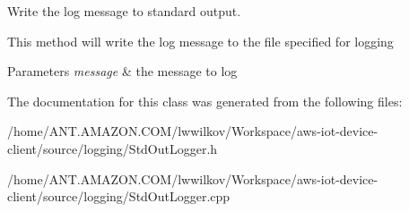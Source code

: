 Write the log message to standard output. 

This method will write the log message to the file specified for logging 
\begin{DoxyParams}{Parameters}
{\em message} & the message to log \\
\hline
\end{DoxyParams}


The documentation for this class was generated from the following files\+:\begin{DoxyCompactItemize}
\item 
/home/\+A\+N\+T.\+A\+M\+A\+Z\+O\+N.\+C\+O\+M/lwwilkov/\+Workspace/aws-\/iot-\/device-\/client/source/logging/Std\+Out\+Logger.\+h\item 
/home/\+A\+N\+T.\+A\+M\+A\+Z\+O\+N.\+C\+O\+M/lwwilkov/\+Workspace/aws-\/iot-\/device-\/client/source/logging/Std\+Out\+Logger.\+cpp\end{DoxyCompactItemize}
